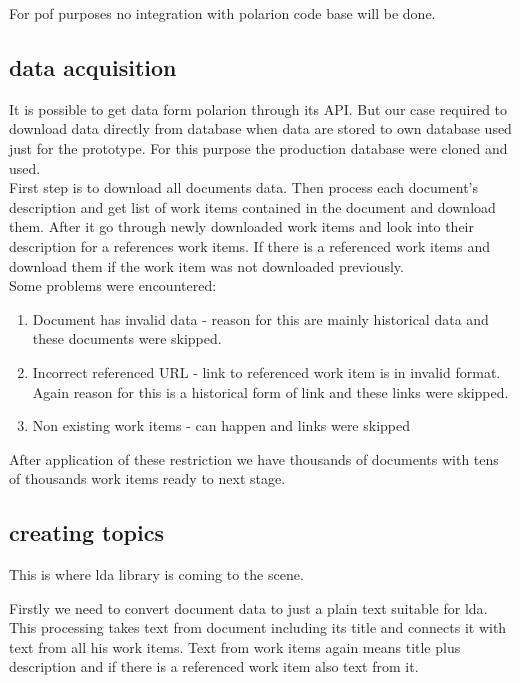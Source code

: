 \documentclass[thesis=M,english]{FITthesis}[2012/06/26]
\begin{document}
For \acrshort{pof} purposes no integration with \acrshort{polarion} code base will be done. 

\subsection{data acquisition}

It is possible to get data form \acrshort{polarion} through its API. But our case required to download data directly from database when data are stored to own database used just for the prototype. For this purpose the production database were cloned and used.\\

First step is to download all documents data. Then process each document's description and get list of work items contained in the document and download them. After it go through newly downloaded work items and look into their description for a references work items. If there is a referenced work items and download them if the work item was not downloaded previously.\\ 

Some problems were encountered:
\begin{enumerate}[nosep]
	\item Document has invalid data
	- reason for this are mainly historical data and these documents were skipped.
	\item Incorrect referenced URL
	- link to referenced work item is in invalid format. Again reason for this is a historical form of link and these links were skipped. 
	\item Non existing work items
	- can happen and links were skipped
\end{enumerate} 

After application of these restriction we have thousands of documents with tens of thousands work items ready to next stage.

\subsection{creating topics}  

This is where \acrshort{lda} library is coming to the scene.

Firstly we need to convert document data to just a plain text suitable for \acrshort{lda}. This processing takes text from document including its title and connects it with text from all his work items. Text from work items again means title plus description and if there is a referenced work item also text from it.\\
\end{document}
